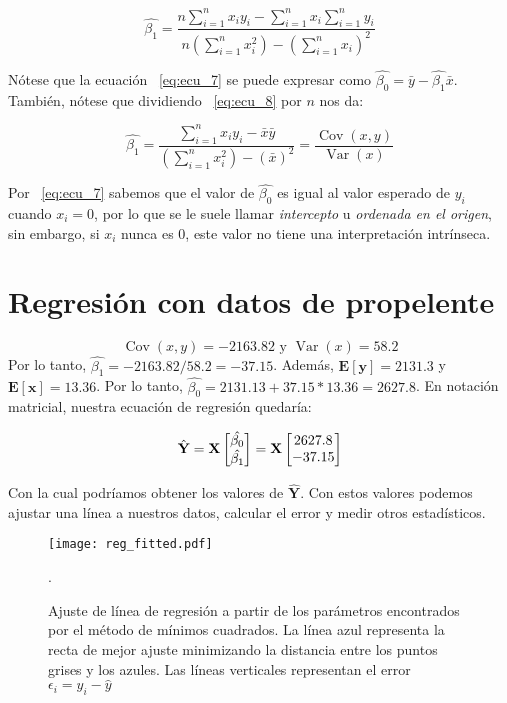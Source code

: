 \documentclass[letterpaper,12pt]{article}
\DeclareMathOperator{\Var}{\mathrm{Var}}
\DeclareMathOperator{\Cov}{\mathrm{Cov}}
\begin{document}
\begin{equation}
\hat{\beta_1} = \frac{n\sum_{i=1}^{n}x_iy_i - \sum_{i=1}^{n}x_i\sum_{i=1}^{n}y_i }{n(\sum_{i=1}^{n} x_i^2) - (\sum_{i=1}^{n}x_i)^2}
\label{eq:ecu_8}
\end{equation}

Nótese que la ecuación ~\ref{eq:ecu_7} se puede expresar como $\hat{\beta_0} = \bar{y}-\hat{\beta_1}\bar{x}$. También, nótese que dividiendo ~\ref{eq:ecu_8} por $n$ nos da:

\begin{equation}
\hat{\beta_1} = \frac{\sum_{i=1}^{n}x_iy_i - \bar{x} \bar{y}}{(\sum_{i=1}^{n} x_i^2) - (\bar{x})^2} = \frac{\Cov(x,y)}{\Var(x)}
\label{eq:ecu_8}
\end{equation}

Por ~\ref{eq:ecu_7} sabemos que el valor de $\hat{\beta_0}$ es igual al valor esperado de $y_i$ cuando $x_i = 0$, por lo que se le suele llamar \textit{intercepto} u \textit{ordenada en el origen}, sin embargo, si $x_i$ nunca es 0, este valor no tiene una interpretación intrínseca. 

\section*{Regresión con datos de propelente}

\[\Cov(x,y) = -2163.82 \text{ y } \Var(x) = 58.2\] Por lo tanto, $\hat{\beta_1} =-2163.82/58.2 = -37.15$. Además, $\mathbf{E[y]} = 2131.3$ y $\mathbf{E[x]} =13.36$. Por lo tanto, $\hat{\beta_0} =2131.13 + 37.15*13.36 = 2627.8$. En notación matricial, nuestra ecuación de regresión quedaría:

\[
\hat{\textbf{Y}} = \text{\textbf{X}}
\begin{bmatrix}
\hat{\beta_0} \\
\hat{\beta_1}
\end{bmatrix} = \text{\textbf{X}}
\begin{bmatrix}
2627.8 \\
-37.15
\end{bmatrix}
\]

Con la cual podríamos obtener los valores de $\hat{\textbf{Y}}$. Con estos valores podemos ajustar una línea a nuestros datos, calcular el error y medir otros estadísticos. 

\begin{figure}[H]
	\centering
	\texttt{[image: reg\_fitted.pdf]}
	\caption{Ajuste de línea de regresión a partir de los parámetros encontrados por el método de mínimos cuadrados. La línea azul representa la recta de mejor ajuste minimizando la distancia entre los puntos grises y los azules. Las líneas verticales representan el error $\epsilon_i = y_i - \hat{y}$}. 
	\label{fig_2}
\end{figure}
\end{document}
